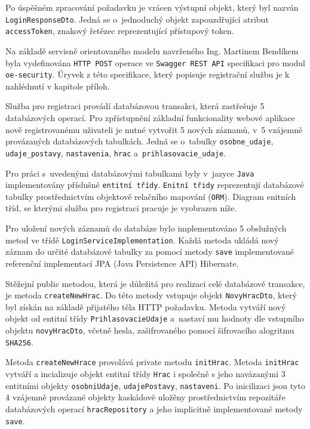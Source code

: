 \documentclass[twoside, 12pt]{article}
\begin{document}
{Po úspěšném zpracování požadavku je vrácen výstupní objekt,
který byl nazván \texttt{LoginResponseDto}.
Jedná se o~jednoduchý objekt zapouzdřující atribut \texttt{accessToken}, znakový řetězec reprezentující přístupový token.

Na základě servisně orientovaného modelu navrženého Ing. Martinem Bendíkem byla vydefinována \texttt{HTTP POST} operace ve \texttt{Swagger REST API} specifikaci pro modul \texttt{oe-security}.
Úryvek z této specifikace,
který popisuje registrační službu je k nahlédnutí v kapitole příloh.

Služba pro registraci provádí databázovou transakci,
která zastřešuje 5 databázových operací.
Pro zpřístupnění základní funkcionality webové aplikace nově registrovanému uživateli je nutné vytvořit 5 nových záznamů,
v~5 vzájemně provázaných databázových tabulkách.
Jedná se o~tabulky \texttt{osobne\_udaje},
\texttt{udaje\_postavy}, \texttt{nastavenia}, \texttt{hrac} a~\texttt{prihlasovacie\_udaje}.

Pro práci s~uvedenými databázovými tabulkami byly v~jazyce \texttt{Java} implementovány příslušné \texttt{entitní třídy}. \texttt{Enitní třidy} reprezentují databázové tabulky prostřednictvím
objektově relačního mapování (\texttt{ORM}).
Diagram enitních tříd, se kterými služba pro registraci pracuje je vyobrazen níže.

\obrazek
{}

\clearpage

Pro uložení nových záznamů do databáze bylo implementováno 5 obslužných metod ve třídě \texttt{LoginServiceImplementation}.
Každá metoda ukládá nový záznam do určité databázové tabulky
za pomocí metody \texttt{save} implementované
referenční implementací JPA (Java Persistence API) Hibernate.

Stěžejní public metodou, která je důležitá pro realizaci celé databázové transakce, je metoda \texttt{createNewHrac}.
Do této metody vstupuje objekt \texttt{NovyHracDto}, který byl získán na základě přijatého těla HTTP požadavku.
Metoda vytváří nový objekt od entitní třídy \texttt{PrihlasovacieUdaje} a~nastaví mu hodnoty dle vstupního objektu \texttt{novyHracDto},
včetně hesla, zašifrovaného pomocí šifrovacího alogritmu \texttt{SHA256}.

Metoda \texttt{createNewHrace} provolává private metodu \texttt{initHrac}.
Metoda \texttt{initHrac} vytváří a incializuje objekt entitní třídy \texttt{Hrac}
i společně s jeho navázanými 3 entitními objekty
 \texttt{osobniUdaje},
\texttt{udajePostavy}, \texttt{nastaveni}.
Po inicilizaci jsou tyto 4 vzájemně provázané objekty kaskádově uložěny prostřednictvím
repozitáře databázových operací \texttt{hracRepository} a jeho implicitně implementované metody \texttt{save}.

}
\end{document}
